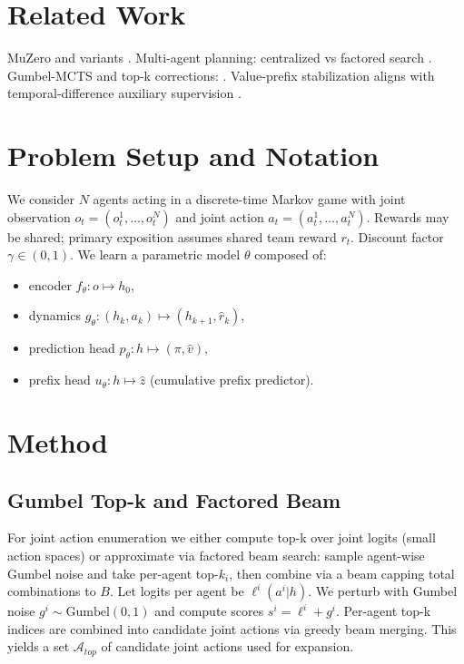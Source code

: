 \documentclass{article}
\begin{document}
\section{Related Work}
MuZero and variants \cite{schrittwieser2019mastering,wang2024efficientzero}. Multi-agent planning: centralized vs factored search \cite{bellemare2024multiagent,madz2020}. Gumbel-MCTS and top-k corrections: \cite{wang2024efficientzero}. Value-prefix stabilization aligns with temporal-difference auxiliary supervision \cite{hafner2023dreamer}.

\section{Problem Setup and Notation}
We consider $N$ agents acting in a discrete-time Markov game with joint observation $o_t=(o_t^1,\dots,o_t^N)$ and joint action $a_t=(a_t^1,\dots,a_t^N)$. Rewards may be shared; primary exposition assumes shared team reward $r_t$. Discount factor $\gamma\in(0,1)$. We learn a parametric model $\theta$ composed of:
\begin{itemize}[noitemsep]
  \item encoder $f_\theta: o \mapsto h_0$,
  \item dynamics $g_\theta: (h_k,a_k)\mapsto (h_{k+1}, \hat r_k)$,
  \item prediction head $p_\theta: h \mapsto (\pi,\hat v)$,
  \item prefix head $u_\theta: h \mapsto \hat z$ (cumulative prefix predictor).
\end{itemize}

\section{Method}
\subsection{Gumbel Top-k and Factored Beam}
For joint action enumeration we either compute top-k over joint logits (small action spaces) or approximate via factored beam search: sample agent-wise Gumbel noise and take per-agent top-$k_i$, then combine via a beam capping total combinations to $B$. Let logits per agent be $\ell^i(a^i|h)$. We perturb with Gumbel noise $g^i\sim\text{Gumbel}(0,1)$ and compute scores $s^i=\ell^i+g^i$. Per-agent top-k indices are combined into candidate joint actions via greedy beam merging. This yields a set $\mathcal{A}_{top}$ of candidate joint actions used for expansion.
\end{document}
